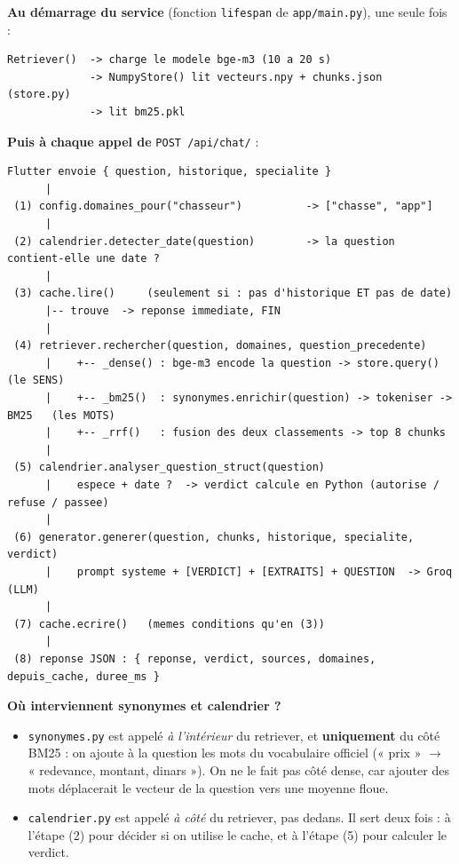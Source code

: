 \documentclass[11pt,a4paper]{article}
\newcommand{\fichier}[1]{\texttt{#1}}
\begin{document}
\textbf{Au démarrage du service} (fonction \texttt{lifespan} de \fichier{app/main.py}),
une seule fois :

\begin{shaded}
\begin{Verbatim}[fontsize=\footnotesize]
Retriever()  -> charge le modele bge-m3 (10 a 20 s)
             -> NumpyStore() lit vecteurs.npy + chunks.json      (store.py)
             -> lit bm25.pkl
\end{Verbatim}
\end{shaded}

\textbf{Puis à chaque appel de} \texttt{POST /api/chat/} :

\begin{shaded}
\begin{Verbatim}[fontsize=\footnotesize]
 Flutter envoie { question, historique, specialite }
      |
 (1) config.domaines_pour("chasseur")          -> ["chasse", "app"]
      |
 (2) calendrier.detecter_date(question)        -> la question contient-elle une date ?
      |
 (3) cache.lire()     (seulement si : pas d'historique ET pas de date)
      |-- trouve  -> reponse immediate, FIN
      |
 (4) retriever.rechercher(question, domaines, question_precedente)
      |    +-- _dense() : bge-m3 encode la question -> store.query()     (le SENS)
      |    +-- _bm25()  : synonymes.enrichir(question) -> tokeniser -> BM25   (les MOTS)
      |    +-- _rrf()   : fusion des deux classements -> top 8 chunks
      |
 (5) calendrier.analyser_question_struct(question)
      |    espece + date ?  -> verdict calcule en Python (autorise / refuse / passee)
      |
 (6) generator.generer(question, chunks, historique, specialite, verdict)
      |    prompt systeme + [VERDICT] + [EXTRAITS] + QUESTION  -> Groq (LLM)
      |
 (7) cache.ecrire()   (memes conditions qu'en (3))
      |
 (8) reponse JSON : { reponse, verdict, sources, domaines, depuis_cache, duree_ms }
\end{Verbatim}
\end{shaded}

\textbf{Où interviennent synonymes et calendrier ?}
\begin{itemize}
  \item \fichier{synonymes.py} est appelé \emph{à l'intérieur} du retriever, et
        \textbf{uniquement} du côté BM25 : on ajoute à la question les mots du vocabulaire
        officiel (« prix » $\rightarrow$ « redevance, montant, dinars »). On ne le fait
        pas côté dense, car ajouter des mots déplacerait le vecteur de la question vers une
        moyenne floue.
  \item \fichier{calendrier.py} est appelé \emph{à côté} du retriever, pas dedans. Il sert
        deux fois : à l'étape (2) pour décider si on utilise le cache, et à l'étape (5)
        pour calculer le verdict.
\end{itemize}
\end{document}
